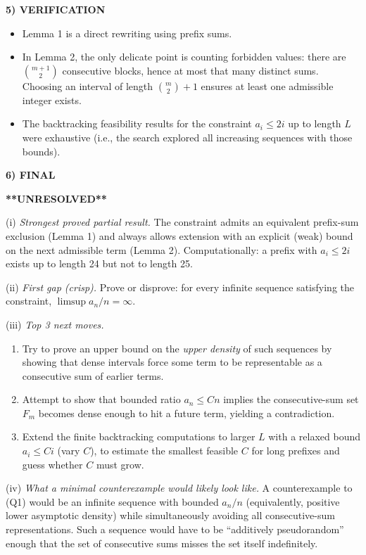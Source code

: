 \medskip
\noindent\textbf{5) VERIFICATION}

\begin{itemize}
\item Lemma 1 is a direct rewriting using prefix sums.
\item In Lemma 2, the only delicate point is counting forbidden values: there are $\binom{m+1}{2}$ consecutive blocks, hence at most that many distinct sums.
Choosing an interval of length $\binom{m}{2}+1$ ensures at least one admissible integer exists.
\item The backtracking feasibility results for the constraint $a_i\le 2i$ up to length $L$ were exhaustive (i.e., the search explored all increasing sequences with those bounds).
\end{itemize}

\medskip
\noindent\textbf{6) FINAL}

\textbf{**UNRESOLVED**}

(i) \emph{Strongest proved partial result.} The constraint admits an equivalent prefix-sum exclusion (Lemma 1) and always allows extension with an explicit (weak) bound on the next admissible term (Lemma 2). Computationally: a prefix with $a_i\le 2i$ exists up to length 24 but not to length 25.

(ii) \emph{First gap (crisp).} Prove or disprove: for every infinite sequence satisfying the constraint, $\limsup a_n/n=\infty$.

(iii) \emph{Top 3 next moves.}
\begin{enumerate}
\item Try to prove an upper bound on the \emph{upper density} of such sequences by showing that dense intervals force some term to be representable as a consecutive sum of earlier terms.
\item Attempt to show that bounded ratio $a_n\le Cn$ implies the consecutive-sum set $F_m$ becomes dense enough to hit a future term, yielding a contradiction.
\item Extend the finite backtracking computations to larger $L$ with a relaxed bound $a_i\le C i$ (vary $C$), to estimate the smallest feasible $C$ for long prefixes and guess whether $C$ must grow.
\end{enumerate}

(iv) \emph{What a minimal counterexample would likely look like.} A counterexample to (Q1) would be an infinite sequence with bounded $a_n/n$ (equivalently, positive lower asymptotic density) while simultaneously avoiding all consecutive-sum representations. Such a sequence would have to be ``additively pseudorandom'' enough that the set of consecutive sums misses the set itself indefinitely.



